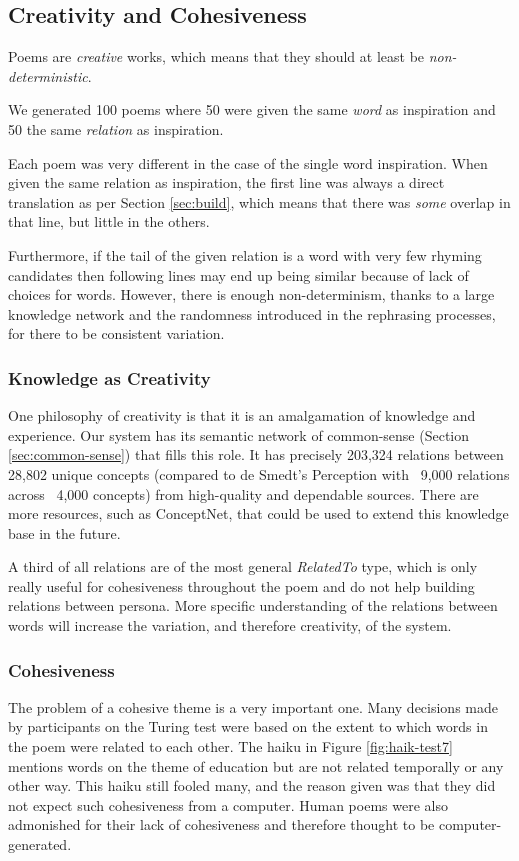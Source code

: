 \subsection{Creativity and Cohesiveness}
Poems are \textit{creative} works, which means that they should at least be \textit{non-deterministic}.

We generated 100 poems where 50 were given the same \textit{word} as inspiration and 50 the same \textit{relation} as inspiration.

Each poem was very different in the case of the single word inspiration. When given the same relation as inspiration, the first line was always a direct translation as per Section \ref{sec:build}, which means that there was \textit{some} overlap in that line, but little in the others.

Furthermore, if the tail of the given relation is a word with very few rhyming candidates then following lines may end up being similar because of lack of choices for words. However, there is enough non-determinism, thanks to a large knowledge network and the randomness introduced in the rephrasing processes, for there to be consistent variation.

\subsubsection{Knowledge as Creativity}
One philosophy of creativity is that it is an amalgamation of knowledge and experience. Our system has its semantic network of common-sense (Section \ref{sec:common-sense}) that fills this role. It has precisely 203,324 relations between 28,802 unique concepts (compared to de Smedt's Perception with ~9,000 relations across ~4,000 concepts) from high-quality and dependable sources. There are more resources, such as ConceptNet, that could be used to extend this knowledge base in the future.

A third of all relations are of the most general \textit{RelatedTo} type, which is only really useful for cohesiveness throughout the poem and do not help building relations between persona. More specific understanding of the relations between words will increase the variation, and therefore creativity, of the system.


\subsubsection{Cohesiveness}
The problem of a cohesive theme is a very important one. Many decisions made by participants on the Turing test were based on the extent to which words in the poem were related to each other. The haiku in Figure \ref{fig:haik-test7} mentions words on the theme of education but are not related temporally or any other way. This haiku still fooled many, and the reason given was that they did not expect such cohesiveness from a computer. Human poems were also admonished for their lack of cohesiveness and therefore thought to be computer-generated.

